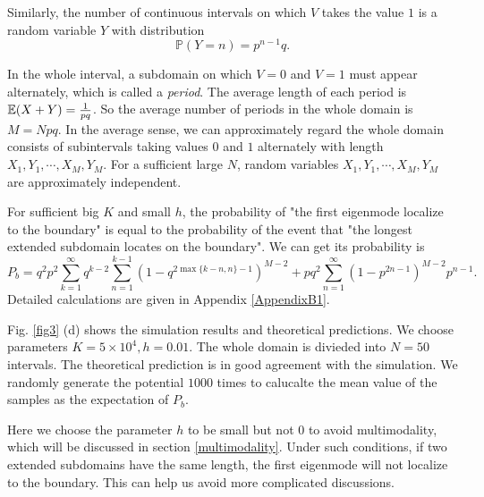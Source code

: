 \documentclass[a4paper,11pt]{article}
\begin{document}
Similarly, the number of continuous intervals on which $V$ takes the value $1$ is a random variable $Y$ with distribution
$$ \mathbb{P}(Y = n) = p^{n-1} q. $$

In the whole interval, a subdomain on which $V = 0$ and $V = 1$ must appear alternately, which is called a \emph{period}. The average length of each period is $\mathbb{E}(X + Y) = \frac{1}{p q}$. So the average number of periods in the whole domain is $M = N p q$. In the average sense, we can approximately regard the whole domain consists of subintervals taking values $0$ and $1$ alternately with length $X_1, Y_1, \cdots, X_M, Y_M$. For a sufficient large $N$, random variables $X_1, Y_1, \cdots, X_M, Y_M$ are approximately independent.

For sufficient big $K$ and small $h$, the probability of "the first eigenmode localize to the boundary" is equal to the probability of the event that "the longest extended subdomain locates on the boundary". We can get its probability is
\begin{equation}\label{bdprob}
P_b = q^2 p^2 \sum_{k=1}^{\infty} q^{k-2} \sum_{n=1}^{k-1} (1 - q^{2 \max\{k-n,n\}-1})^{M-2} + p q^2 \sum_{n=1}^{\infty} (1 - p^{2 n-1})^{M-2} p^{n-1}.
\end{equation}
Detailed calculations are given in Appendix \ref{AppendixB1}.

Fig. \ref{fig3} (d) shows the simulation results and theoretical predictions. We choose parameters $K = 5 \times 10^4, h = 0.01$. The whole domain is divieded into $N = 50$ intervals. The theoretical prediction is in good agreement with the simulation. We randomly generate the potential $1000$ times to calucalte the mean value of the samples as the expectation of $P_b$.

\begin{remark}
Here we choose the parameter $h$ to be small but not $0$ to avoid multimodality, which will be discussed in section \ref{multimodality}. Under such conditions, if two extended subdomains have the same length, the first eigenmode will not localize to the boundary. This can help us avoid more complicated discussions.
\end{remark}
\end{document}
